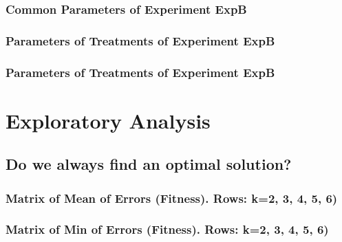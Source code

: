 \documentclass[18pt,c]{beamer}
\makeatletter
\let\beamer@writeslidentry@miniframeson=\beamer@writeslidentry
\newcommand*{\miniframeson}{\let\beamer@writeslidentry=\beamer@writeslidentry@miniframeson}
\makeatother
\begin{document}
 \begin{frame}
 \fontsize{8pt}{9pt}\selectfont
 \frametitle{ Common Parameters of Experiment ExpB }

 \label{ExpBCommonTable001.tex}  
 \end{frame}

 \begin{frame}
 \fontsize{8pt}{9pt}\selectfont
 \frametitle{ Parameters of Treatments of Experiment ExpB }

 \label{ExpBDifferentTable000.tex}  
 \end{frame}

 \begin{frame}
 \fontsize{8pt}{9pt}\selectfont
 \frametitle{ Parameters of Treatments of Experiment ExpB }

 \label{ExpBDifferentTable001.tex}  
 \end{frame}

\miniframeson
\section{Exploratory Analysis}
\miniframeson
\subsection{Do we always find an optimal solution?}
 \begin{frame}
 \fontsize{8pt}{9pt}\selectfont
 \frametitle{ Matrix of Mean of Errors (Fitness).  Rows: k=2, 3, 4, 5, 6) }

 \label{ExpBMeanMatrixTable000.tex}  
 \end{frame}

 \begin{frame}
 \fontsize{8pt}{9pt}\selectfont
 \frametitle{ Matrix of Min of Errors (Fitness). Rows: k=2, 3, 4, 5, 6) }

 \label{ExpBMeanMatrixTable001.tex}  
 \end{frame}
\end{document}
